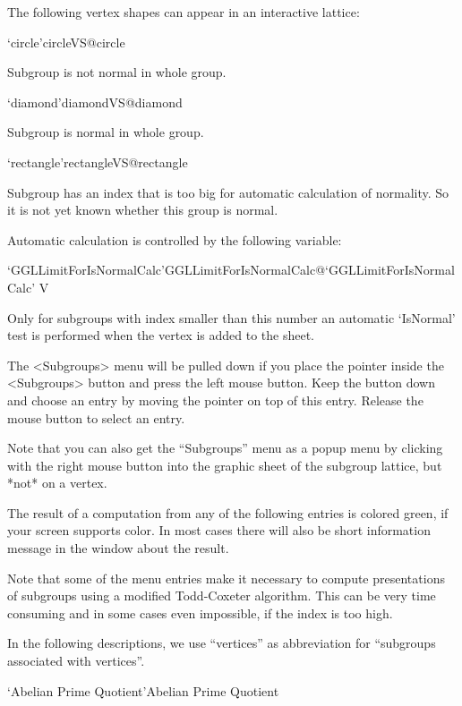 The following vertex shapes can appear in an interactive lattice:

\>`circle'{circleVS}@{circle}

  Subgroup is not normal in whole group.

\>`diamond'{diamondVS}@{diamond}

  Subgroup is normal in whole group.

\>`rectangle'{rectangleVS}@{rectangle}

  Subgroup has an index that is too big for automatic calculation of
  normality. So it is not yet known whether this group is normal.

\bigskip

Automatic calculation is controlled by the following variable:

\>`GGLLimitForIsNormalCalc'{GGLLimitForIsNormalCalc}@{`GGLLimitForIsNormalCalc'} V

  Only for subgroups with index smaller than this number an automatic
  `IsNormal' test is performed when the vertex is added to the sheet.



The <Subgroups> menu will be pulled down  if you place the pointer inside
the <Subgroups> button and press the  left mouse button.  Keep the button
down and  choose an entry by  moving  the pointer on   top of this entry.
Release the mouse button to select an entry.

Note that you can also get the ``Subgroups'' menu as a popup menu by
clicking with the right mouse button into the graphic sheet of the subgroup
lattice, but *not* on a vertex.

The result of  a computation  from any  of  the following entries  is
colored green, if  your screen supports color.   In most cases there will
also be short information message in the {\GAP} window about the result.

Note that  some of   the menu entries  make  it  necessary  to compute
presentations of subgroups   using a modified Todd-Coxeter  algorithm. 
This can be very time consuming and  in some cases even impossible, if
the index is too high.

In  the following descriptions, we  use ``vertices'' as abbreviation for
``subgroups associated with vertices''.

\>`Abelian Prime Quotient'{Abelian Prime Quotient}

